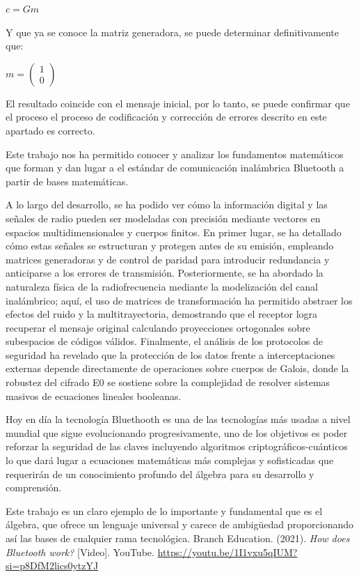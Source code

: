 \documentclass[letterpaper,12pt]{article}
\begin{document}
\centerline{$c=Gm$}

Y que ya se conoce la matriz generadora, se puede determinar definitivamente que:

\centerline{$m = \begin{pmatrix}1 \\ 0\end{pmatrix}$}

El resultado coincide con el mensaje inicial, por lo tanto, se puede confirmar que el proceso
el proceso de codificación y corrección de errores descrito en este apartado es correcto.





\newpage
{}
Este trabajo nos ha permitido conocer y analizar los fundamentos matemáticos que forman y dan lugar a 
el estándar de comunicación inalámbrica Bluetooth a partir de bases matemáticas. 

A lo largo del desarrollo, se ha podido ver cómo la información digital y las señales de radio pueden 
ser modeladas con precisión mediante vectores en espacios multidimensionales y cuerpos finitos. En primer
lugar, se ha detallado cómo estas señales se estructuran y protegen antes de su emisión, empleando
matrices generadoras y de control de paridad para introducir redundancia y anticiparse a los errores de transmisión.
Posteriormente, se ha abordado la naturaleza física de la radiofrecuencia mediante la modelización del canal
inalámbrico; aquí, el uso de matrices de transformación ha permitido abstraer los efectos del ruido y la
multitrayectoria, demostrando que el receptor logra recuperar el mensaje original calculando proyecciones 
ortogonales sobre subespacios de códigos válidos. Finalmente, el análisis de los protocolos de seguridad ha
revelado que la protección de los datos frente a interceptaciones externas depende directamente de operaciones 
sobre cuerpos de Galois, donde la robustez del cifrado E0 se sostiene sobre la complejidad de resolver sistemas masivos
de ecuaciones lineales booleanas. 

Hoy en día la tecnología Bluethooth es una de las tecnologías más usadas a nivel mundial que sigue evolucionando 
progresivamente, uno de los objetivos es poder reforzar la seguridad de las claves incluyendo algoritmos 
criptográficos-cuánticos lo que dará lugar a ecuaciones matemáticas más complejas y sofisticadas que requerirán
de un conocimiento profundo del álgebra para su desarrollo y comprensión.  

Este trabajo es un claro ejemplo de lo importante y fundamental que es el álgebra, que ofrece
un lenguaje universal y carece de ambigüedad proporcionando así las bases de cualquier rama tecnológica. 
\newpage
{}
Branch Education. (2021). \textit{How does Bluetooth work?} [Video]. YouTube. \url{https://youtu.be/1I1vxu5qIUM?si=p8DfM2lics0ytzYJ}
\end{document}
